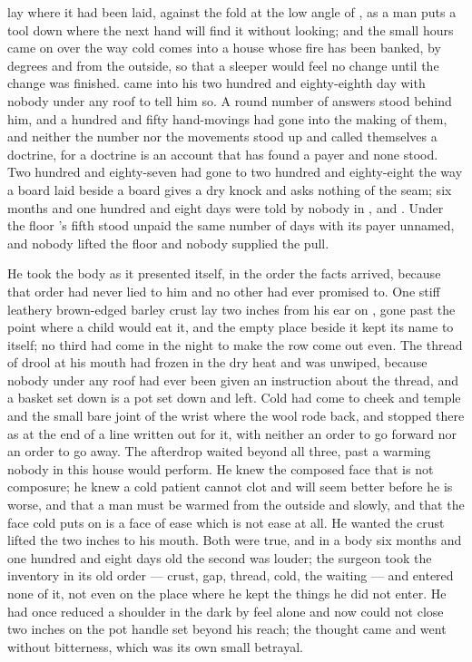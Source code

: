 
 lay where it had been laid, against the fold at the low angle of , as a man puts a tool down where the next hand will find it without looking; and the small hours came on over  the way cold comes into a house whose fire has been banked, by degrees and from the outside, so that a sleeper would feel no change until the change was finished.  came into his two hundred and eighty-eighth day with nobody under any roof to tell him so. A round number of answers stood behind him, and a hundred and fifty hand-movings had gone into the making of them, and neither the number nor the movements stood up and called themselves a doctrine, for a doctrine is an account that has found a payer and none stood. Two hundred and eighty-seven had gone to two hundred and eighty-eight the way a board laid beside a board gives a dry knock and asks nothing of the seam; six months and one hundred and eight days were told by nobody in ,  and . Under the floor 's fifth stood unpaid the same number of days with its payer unnamed, and nobody lifted the floor and nobody supplied the pull.

He took the body as it presented itself, in the order the facts arrived, because that order had never lied to him and no other had ever promised to. One stiff leathery brown-edged barley crust lay two inches from his ear on , gone past the point where a child would eat it, and the empty place beside it kept its name to itself; no third had come in the night to make the row come out even. The thread of drool at his mouth had frozen in the dry heat and was unwiped, because nobody under any roof had ever been given an instruction about the thread, and a basket set down is a pot set down and left. Cold had come to cheek and temple and the small bare joint of the wrist where the wool rode back, and stopped there as at the end of a line written out for it, with neither an order to go forward nor an order to go away. The afterdrop waited beyond all three, past a warming nobody in this house would perform. He knew the composed face that is not composure; he knew a cold patient cannot clot and will seem better before he is worse, and that a man must be warmed from the outside and slowly, and that the face cold puts on is a face of ease which is not ease at all. He wanted the crust lifted the two inches to his mouth. Both were true, and in a body six months and one hundred and eight days old the second was louder; the surgeon took the inventory in its old order --- crust, gap, thread, cold, the waiting --- and entered none of it, not even on the place where he kept the things he did not enter. He had once reduced a shoulder in the dark by feel alone and now could not close two inches on the pot handle set beyond his reach; the thought came and went without bitterness, which was its own small betrayal.

